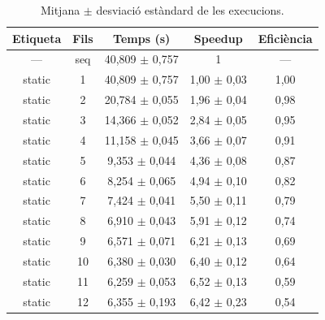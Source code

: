 \begin{table}[H]
\centering
\begin{tabular}{|c|c|c|c|c|}
\hline
\textbf{Etiqueta} & \textbf{Fils} & \textbf{Temps (s)} & \textbf{Speedup} & \textbf{Eficiència} \\ \hline
--- & seq & 40,809 $\pm$ 0,757 & 1 & --- \\ \hline
static & 1 & 40,809 $\pm$ 0,757 & 1,00 $\pm$ 0,03 & 1,00 \\ \hline
static & 2 & 20,784 $\pm$ 0,055 & 1,96 $\pm$ 0,04 & 0,98 \\ \hline
static & 3 & 14,366 $\pm$ 0,052 & 2,84 $\pm$ 0,05 & 0,95 \\ \hline
static & 4 & 11,158 $\pm$ 0,045 & 3,66 $\pm$ 0,07 & 0,91 \\ \hline
static & 5 & 9,353 $\pm$ 0,044 & 4,36 $\pm$ 0,08 & 0,87 \\ \hline
static & 6 & 8,254 $\pm$ 0,065 & 4,94 $\pm$ 0,10 & 0,82 \\ \hline
static & 7 & 7,424 $\pm$ 0,041 & 5,50 $\pm$ 0,11 & 0,79 \\ \hline
static & 8 & 6,910 $\pm$ 0,043 & 5,91 $\pm$ 0,12 & 0,74 \\ \hline
static & 9 & 6,571 $\pm$ 0,071 & 6,21 $\pm$ 0,13 & 0,69 \\ \hline
static & 10 & 6,380 $\pm$ 0,030 & 6,40 $\pm$ 0,12 & 0,64 \\ \hline
static & 11 & 6,259 $\pm$ 0,053 & 6,52 $\pm$ 0,13 & 0,59 \\ \hline
static & 12 & 6,355 $\pm$ 0,193 & 6,42 $\pm$ 0,23 & 0,54 \\ \hline
\end{tabular}
\caption{Mitjana $\pm$ desviació estàndard de les execucions.}
\label{tab:resultats}
\end{table}
